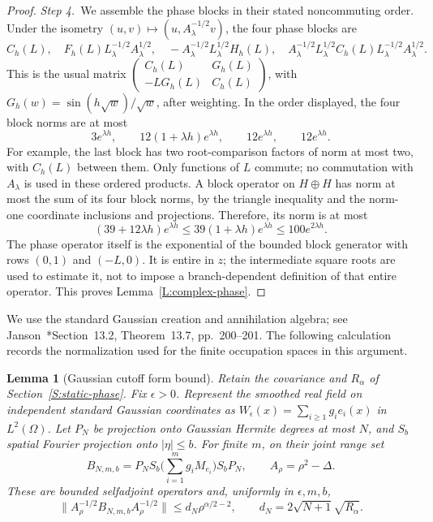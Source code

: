 \documentclass[12pt,oneside,openany]{book}
\makeatletter
\let\lean@pending\@empty
\newcommand{\LeanMarker}[1]{\gdef\lean@pending{#1}}
\numberwithin{equation}{section}
\newtheorem{lemma}[theorem]{Lemma}
\theoremstyle{nogostyle}
\theoremstyle{definition}
\makeatother
\begin{document}
\begin{proof}
  \medskip
  \noindent\textit{Step 4.~}We assemble the phase blocks in their stated
  noncommuting order.
  Under the isometry $(u,v)\mapsto(u,A_\lambda^{-1/2}v)$, the four phase blocks
  are
  \[
    C_h(L),\quad
    F_h(L)L_\lambda^{-1/2}A_\lambda^{1/2},\quad
    -A_\lambda^{-1/2}L_\lambda^{1/2}H_h(L),\quad
    A_\lambda^{-1/2}L_\lambda^{1/2}C_h(L)
    L_\lambda^{-1/2}A_\lambda^{1/2}.
  \]
  This is the usual matrix
  $\left(\begin{smallmatrix}C_h(L)&G_h(L)\\-LG_h(L)&C_h(L)\end{smallmatrix}\right)$,
  with $G_h(w) = \sin(h\sqrt w)/\sqrt w$, after weighting. In the order
  displayed, the four block norms are at most
  \[
    3e^{\lambda h},\qquad
    12(1+\lambda h)e^{\lambda h},\qquad
    12e^{\lambda h},\qquad12e^{\lambda h}.
  \]
  For example, the last block has two root-comparison factors of norm at most
  two, with $C_h(L)$ between them. Only functions of $L$ commute; no commutation
  with $A_\lambda$ is used in these ordered products. A block operator on
  $H\oplus H$ has norm at most the sum of its four block norms, by the triangle
  inequality and the norm-one coordinate inclusions and projections. Therefore,
  its norm is at most
  \[
    (39+12\lambda h)e^{\lambda h}
    \le39(1+\lambda h)e^{\lambda h}\le100e^{2\lambda h}.
  \]
  The phase operator itself is the exponential of the bounded block generator
  with rows $(0,1)$ and $(-L,0)$. It is entire in $z$; the intermediate square
  roots are used to estimate it, not to impose a branch-dependent definition of
  that entire operator. This proves Lemma~\ref{L:complex-phase}.
\end{proof}

We use the standard Gaussian creation and annihilation algebra; see
Janson~\cite{janson:97:gaussian}*{Section~13.2, Theorem~13.7, pp.~200--201}.
The following calculation records the normalization used for the finite
occupation spaces in this argument.

\LeanMarker{L:fock-form}
\begin{lemma}[Gaussian cutoff form bound]\label{L:fock-form}
  Retain the covariance and $R_\alpha$ of Section~\ref{S:static-phase}. Fix
  $\epsilon > 0$. Represent the smoothed real field on independent standard
  Gaussian coordinates as $W_\epsilon(x) = \sum_{i\ge1}g_i e_i(x)$ in
  $L^2(\Omega)$. Let $P_N$ be projection onto Gaussian Hermite degrees at most
  $N$, and $S_b$ spatial Fourier projection onto $|\eta| \le b$. For finite $m$,
  on their joint range set
  \[
    B_{N,m,b}=P_NS_b\Big(\sum_{i=1}^m g_i M_{e_i}\Big)S_bP_N,\qquad
    A_\rho=\rho^2-\Delta .
  \]
  These are bounded selfadjoint operators and, uniformly in $\epsilon,m,b$,
  \begin{equation}\label{E:fock-sandwich}
    \|A_\rho^{-1/2}B_{N,m,b}A_\rho^{-1/2}\|
    \le d_N\rho^{\alpha/2-2},\qquad
    d_N=2\sqrt{N+1}\sqrt{R_\alpha}.
  \end{equation}
\end{lemma}
\end{document}
